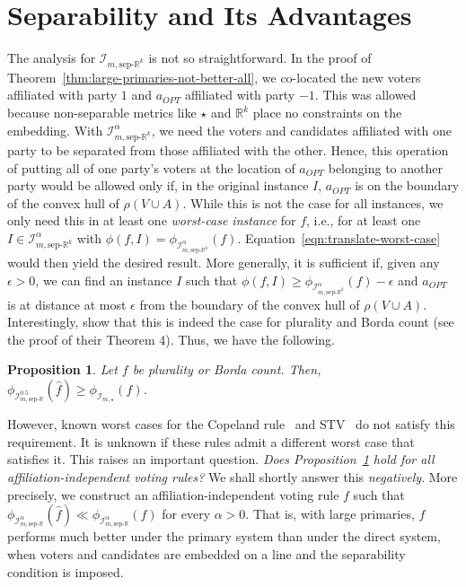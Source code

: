 \documentclass[letterpaper]{article} %
\newtheorem{proposition}[theorem]{Proposition}
\theoremstyle{definition}
\renewcommand{\hat}{\widehat}
\newcommand{\bbR}{\mathbb{R}}
\newcommand{\calI}{\mathcal{I}}
\newcommand{\pleft}{-1}
\newcommand{\pright}{1}
\newcommand{\all}{\star}
\newcommand{\sep}{\textrm{sep-}}
\newcommand{\euc}[1]{\bbR^{#1}}
\newcommand{\eucsep}[1]{\sep\euc{#1}}
\newcommand{\eucline}{\bbR}
\newcommand{\euclinesep}{\sep\eucline}
\newcommand{\I}{\calI}
\begin{document}
\section{Separability and Its Advantages}
\label{sec:large-primaries-better-line}
The analysis for $\I_{m,\eucsep{k}}$ is not so straightforward. In the proof of Theorem~\ref{thm:large-primaries-not-better-all}, we co-located the new voters affiliated with party $\pright$ and $a_{OPT}$ affiliated with party $\pleft$. This was allowed because non-separable metrics like $\all$ and $\euc{k}$ place no constraints on the embedding.
With $\I^{\alpha}_{m,\eucsep{k}}$, we need the voters and candidates affiliated with one party to be separated from those affiliated with the other. Hence, this operation of putting all of one party's voters at the location of $a_{OPT}$ belonging to another party would be allowed only if, in the original instance $I$, $a_{OPT}$ is on the boundary of the convex hull of $\rho(V \cup A)$. While this is not the case for all instances, we only need this in at least one \emph{worst-case instance} for $f$, i.e., for at least one $I \in \I^{\alpha}_{m,\eucsep{k}}$ with $\phi(f,I) = \phi_{\I^{\alpha}_{m,\eucsep{k}}}(f)$. Equation~\eqref{eqn:translate-worst-case} would then yield the desired result. More generally, it is sufficient if, given any $\epsilon > 0$, we can find an instance $I$ such that $\phi(f,I) \ge \phi_{\I^{\alpha}_{m,\eucsep{k}}}(f) - \epsilon$ and $a_{OPT}$ is at distance at most $\epsilon$ from the boundary of the convex hull of $\rho(V \cup A)$.
Interestingly, \cite{ABP15} show that this is indeed the case for plurality and Borda count (see the proof of their Theorem 4). Thus, we have the following.
\begin{proposition}
	Let $f$ be plurality or Borda count. Then, $\phi_{\I^{0.5}_{m,\euclinesep}}(\hat{f}) \ge \phi_{\I_{m,\all}}(f)$.
\label{prop:plu-borda}
\end{proposition}
However, known worst cases for the Copeland rule~\cite{ABP15} and STV~\cite{SE17} do not satisfy this requirement. It is unknown if these rules admit a different worst case that satisfies it.
This raises an important question. \emph{Does Proposition~\ref{prop:plu-borda} hold for all affiliation-independent voting rules?} We shall shortly answer this \emph{negatively}.
More precisely, we construct an affiliation-independent voting rule $f$ such that $\phi_{\I^{\alpha}_{m,\euclinesep}}(\hat{f}) \ll \phi_{\I^{\alpha}_{m,\euclinesep}}(f)$ for every $\alpha > 0$. That is, with large primaries, $f$ performs much better under the primary system than under the direct system, when voters and candidates are embedded on a line and the separability condition is imposed.
\end{document}

